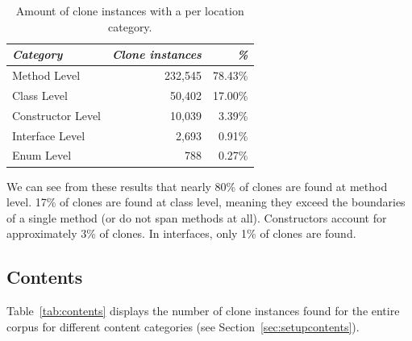 \documentclass[runningheads]{llncs}
\begin{document}
\begin{table}[H]
\centering
\begin{tabular}{@{}lrr@{}}
\toprule
\textit{\textbf{Category}} & \textit{\textbf{Clone instances}} & \textit{\textbf{\%}} \\ \midrule
Method Level & 232,545 & 78.43\% \\
Class Level & 50,402 & 17.00\% \\
Constructor Level & 10,039 & 3.39\% \\
Interface Level & 2,693 & 0.91\% \\
Enum Level & 788 & 0.27\% \\
\end{tabular}
\caption{Amount of clone instances with a per location category.}
\label{tab:location}
\end{table}

We can see from these results that nearly 80\% of clones are found at method level. 17\% of clones are found at class level, meaning they exceed the boundaries of a single method (or do not span methods at all). Constructors account for approximately 3\% of clones. In interfaces, only 1\% of clones are found.

\subsection{Contents}
Table~\ref{tab:contents} displays the number of clone instances found for the entire corpus for different content categories (see Section~\ref{sec:setupcontents}).
\end{document}
